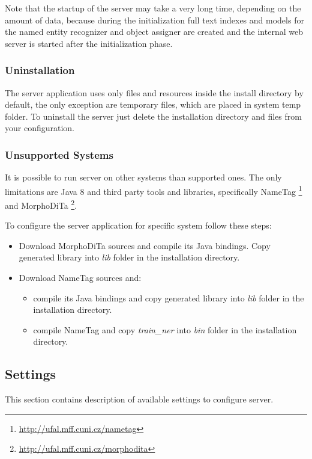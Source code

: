 Note that the startup of the server may take a very long time, depending on the
amount of data, because during the initialization full text indexes
and models for the named entity recognizer and object assigner are created and
the internal web server is started after the initialization phase.

\subsubsection{Uninstallation}
The server application uses only files and resources inside the install
directory by default, the only exception are temporary files, which are placed
in system temp folder. To uninstall the server just delete the installation
directory and files from your configuration.

\subsubsection{Unsupported Systems}
\label{sssec:unsupport}
It is possible to run \textan{} server on other systems than supported ones.
The only limitations are Java 8 and third party tools and libraries,
specifically NameTag%
\footnote{\url{http://ufal.mff.cuni.cz/nametag}} and MorphoDiTa%
\footnote{\url{http://ufal.mff.cuni.cz/morphodita}}.

To configure the server application for specific system follow these steps:
\begin{itemize}
\item Download MorphoDiTa sources and compile its Java bindings. Copy generated
library into \emph{lib} folder in the installation directory.
\item Download NameTag sources and:
	\begin{itemize}
	\item compile its Java bindings and copy generated library into \emph{lib}
	folder in the installation directory.
	\item compile NameTag and copy \emph{train\_ner} into \emph{bin} folder in
	the installation directory.
	\end{itemize}
\end{itemize}

\subsection{Settings}
\label{sec:ServerSettings}

This section contains description of available settings to configure \textan{}
server.

